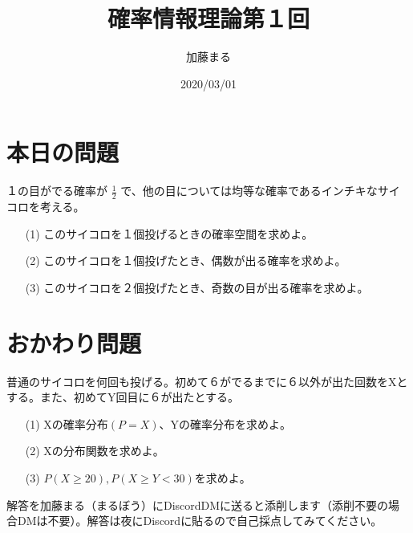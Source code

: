 \documentclass[a4j,uplatex]{jsarticle}
\title{確率情報理論第１回}
\author{加藤まる}
\date{2020/03/01}
\begin{document}
\maketitle
\section*{本日の問題}

１の目がでる確率が $\frac{1}{2}$ で、他の目については均等な確率であるインチキなサイコロを考える。
\begin{itemize}
  \item[(1)] このサイコロを１個投げるときの確率空間を求めよ。 
  \item[(2)] このサイコロを１個投げたとき、偶数が出る確率を求めよ。
  \item[(3)] このサイコロを２個投げたとき、奇数の目が出る確率を求めよ。 
\end{itemize}

\section*{おかわり問題}
普通のサイコロを何回も投げる。初めて６がでるまでに６以外が出た回数をXとする。また、初めてY回目に６が出たとする。
\begin{itemize}
  \item[(1)] Xの確率分布$(P=X)$、Yの確率分布を求めよ。
  \item[(2)] Xの分布関数を求めよ。 
  \item[(3)] $ P(X\ge20) , P(X\ge Y<30) $を求めよ。 
\end{itemize}

解答を加藤まる（まるぼう）にDiscordDMに送ると添削します（添削不要の場合DMは不要）。解答は夜にDiscordに貼るので自己採点してみてください。
\end{document}
